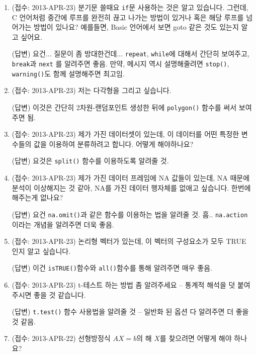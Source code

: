\documentclass{article}
\begin{document}
\begin{enumerate}

	\item (접수: 2013-APR-23)  분기문 쓸때요 \texttt{if}문 사용하는 것은 알고 있습니다.  그런데, C 언어처럼 중간에 루프를 완전히 끊고 나가는 방법이 있거나 혹은 해당 루프를 넘어가는 방법이 있나요?  예를들면, Basic 언어에서 보면 goto 같은 것도 있는지 알고 싶어요.
	
	\textsf{(답변)} 요건... 질문이 좀 방대한건데... \texttt{repeat}, \texttt{while}에 대해서 간단히 보여주고, \texttt{break}과 \texttt{next} 를 알려주면 좋음. 
	만약, 메시지 역시 설명해줄려면  \texttt{stop()}, \texttt{warning()}도 함께 설명해주면 최고임.  

	\item (접수: 2013-APR-23)  저는 다각형을 그리고 싶습니다. 
	
	\textsf{(답변)}  이것은 간단히 2차원-랜덤포인트 생성한 뒤에 \texttt{polygon()} 함수를 써서 보여주면 됨. 


	\item (접수: 2013-APR-23)  제가 가진 데이터셋이 있는데, 이 데이터를 어떤 특정한 변수들의 값을 이용하여 분류하려고 합니다.  어떻게 해야하나요?
	
	\textsf{(답변)}  요것은 \texttt{split()} 함수를 이용하도록 알려줄 것. 

	\item (접수: 2013-APR-23) 제가 가진 데이터 프레임에 NA 값들이 있는데, NA 때문에 분석이 이상해지는 것 같아, NA를 가진 데이터 행자체를 없애고 싶습니다.  한번에 해주는게 없나요? 
	
	\textsf{(답변)}  요건 \texttt{na.omit()}과 같은 함수를 이용하는 법을 알려줄 것.  흠.. \texttt{na.action}이라는 개념을 알려주면 더욱 좋음. 

	\item (접수: 2013-APR-23) 논리형 벡터가 있는데, 이 벡터의 구성요소가 모두 TRUE 인지 알고 싶습니다. 
	
	\textsf{(답변)} 이건 \texttt{isTRUE()}함수와 \texttt{all()}함수를 통해 알려주면 매우 좋음.
	
	\item (접수: 2013-APR-23) t-테스트 하는 방법 좀 알려주세요 -- 통계적 해석을 덧 붙여주시면 좋을 것 같습니다.
	
	\textsf{(답변)} \texttt{t.test()} 함수 사용법을 알려줄 것 -- 일반화 된 옵션 다 알려주면 더 좋을 것 같음. 
	
	\item (접수: 2013-APR-22) 선형방정식 $AX=b$의 해 $X$를 찾으려면 어떻게 해야 하나요? 
	

\end{enumerate}
\end{document}
